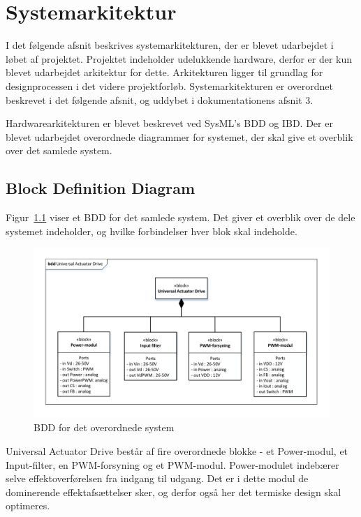 
\chapter{Systemarkitektur}
I det følgende afsnit beskrives systemarkitekturen, der er blevet udarbejdet i løbet af projektet. Projektet indeholder udelukkende hardware, derfor er der kun blevet udarbejdet arkitektur for dette. Arkitekturen ligger til grundlag for designprocessen i det videre projektforløb. Systemarkitekturen er overordnet beskrevet i det følgende afsnit, og uddybet i dokumentationens afsnit 3.

Hardwarearkitekturen er blevet beskrevet ved SysML's BDD og IBD. Der er blevet udarbejdet overordnede diagrammer for systemet, der skal give et overblik over det samlede system.

\section{Block Definition Diagram}
Figur~\ref{fig:BDD} viser et BDD for det samlede system. Det giver et overblik over de dele systemet indeholder, og hvilke forbindelser hver blok skal indeholde. 

\begin{figure}[H]
	\centering
	\includegraphics[width=1\linewidth]{../Dokumentation/tex/systemarkitektur/billeder/BDD.pdf}
	\caption{BDD for det overordnede system}
	\label{fig:BDD}
\end{figure}

Universal Actuator Drive består af fire overordnede blokke - et Power-modul, et Input-filter, en PWM-forsyning og et PWM-modul. Power-modulet indebærer selve effektoverførelsen fra indgang til udgang. Det er i dette modul de dominerende effektafsættelser sker, og derfor også her det termiske design skal optimeres. 

